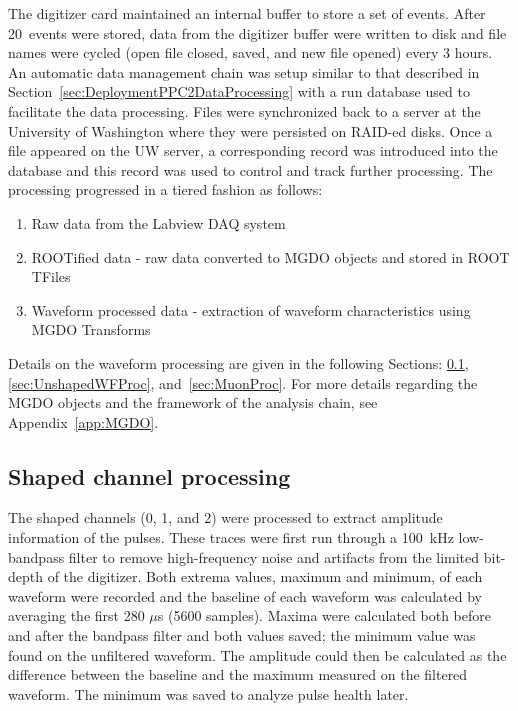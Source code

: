 	The digitizer card maintained an internal buffer to store a set of events.  After 20~events were stored, data from the digitizer buffer were written to disk and file names were cycled (open file closed, saved, and new file opened) every 3 hours.  An automatic data management chain was setup similar to that described in Section~\ref{sec:DeploymentPPC2DataProcessing} with a run database used to facilitate the data processing.  Files were synchronized back to a server at the University of Washington where they were persisted on RAID-ed disks.  Once a file appeared on the UW server, a corresponding record was introduced into the database and this record was used to control and track further processing.  The processing progressed in a tiered fashion as follows:
		\begin{enumerate}
			\item[Tier 0:]  Raw data from the Labview DAQ system
			\item[Tier 1:]  ROOTified data - raw data converted to MGDO objects and stored in ROOT TFiles
			\item[Tier 2:]  Waveform processed data - extraction of waveform characteristics using MGDO Transforms
		\end{enumerate}
Details on the waveform processing are given in the following Sections: \ref{sec:BegeShapedProc}, \ref{sec:UnshapedWFProc}, and~\ref{sec:MuonProc}.  For more details regarding the MGDO objects and the framework of the analysis chain, see Appendix~\ref{app:MGDO}.
	
		\subsection{Shaped channel processing}
		\label{sec:BegeShapedProc}

The shaped channels (0, 1, and 2) were processed to extract amplitude information of the pulses.  These traces were first run through a 100~kHz low-bandpass filter to remove high-frequency noise and artifacts from the limited bit-depth of the digitizer.  Both extrema values, maximum and minimum, of each waveform were recorded and the baseline of each waveform was calculated by averaging the first 280 $\mu$s (5600 samples).  Maxima were calculated both before and after the bandpass filter and both values saved; the minimum value was found on the unfiltered waveform.  The amplitude could then be calculated as the difference between the baseline and the maximum measured on the filtered waveform.  The minimum was saved to analyze pulse health later.

